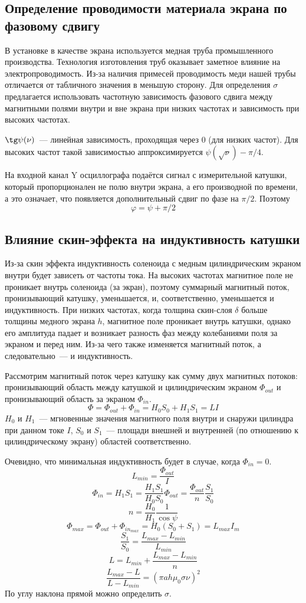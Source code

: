 \subsection{Определение проводимости материала экрана по фазовому сдвигу}
В установке в качестве экрана используется медная труба промышленного производства.
Технология изготовления труб оказывает заметное влияние на электропроводимость.
Из-за наличия примесей проводимость меди нашей трубы отличается от табличного значения
в меньшую сторону. Для определения $\sigma$ предлагается использовать частотную зависимость
 фазового сдвига между магнитными полями внутри и вне
 экрана при низких частотах и зависимость при высоких частотах.

 $\tg\psi(\nu)$~--- линейная зависимость, проходящая через 0 (для низких частот).
 Для высоких частот такой зависимостью аппроксимируется $\psi(\sqrt{\nu})-\pi/4$.

 На входной канал Y осциллографа подаётся сигнал с измерительной катушки, который пропорционален не полю внутри экрана,
 а его производной по времени, а это означает, что появляется дополнительный сдвиг по фазе на
 $\pi/2$. Поэтому
 \[
     \varphi = \psi + \pi/2
 \]
 
 \subsection{Влияние скин-эффекта на индуктивность катушки}
 Из-за скин эффекта индуктивность соленоида с медным цилиндрическим экраном
 внутри будет зависеть от частоты тока. На высоких частотах магнитное поле не проникает внутрь соленоида (за экран), поэтому суммарный магнитный поток, пронизывающий
 катушку, уменьшается, и, соответственно, уменьшается и индуктивность. При низких частотах, когда толщина скин-слоя
 $\delta$ больше толщины медного экрана $h$,  магнитное поле
 проникает внутрь катушки, однако его амплитуда падает  и возникает
 разность фаз между колебаниями поля за экраном и перед ним.  Из-за
 чего также изменяется магнитный поток, а следовательно~--- и индуктивность.

 Рассмотрим магнитный поток через катушку как сумму двух магнитных потоков:
 пронизывающий область между катушкой и цилиндрическим экраном $\Phi_{out}$ и пронизывающий область за экраном $\Phi_{in}$.
 \[
     \Phi = \Phi_{out} + \Phi_{in} = H_{0}S_{0} + H_{1}S_{1} = LI
 \]
 $H_{0}$ и $H_{1}$~---  мгновенные значения магнитного поля внутри и снаружи цилиндра при
 данном токе $I$, $S_{0}$ и $S_{1}$~--- площади внешней и внутренней (по отношению к цилиндрическому
 экрану) областей соответственно.

 Очевидно, что минимальная индуктивность будет в случае, когда $\Phi_{in} = 0$.
 \[
     L_{min} = \frac{\Phi_{out}}{I}
 \]
 \[
     \Phi_{in} = H_{1}S_{1} = \frac{H_{1}S_{1}}{H_{0}S_{0}} \Phi_{out} = \frac{\Phi_{out}}{n}\frac{S_{1}}{S_{0}}
 \]
 \[
     n = \frac{H_{0}}{H_{1}}\frac{1}{\cos\psi}
 \]
 \[
     \Phi_{max} = \Phi_{out} + \Phi_{in_{max}} = H_{0}\left(S_{0}+S_{1}\right)=L_{max}I_{m}
 \]
 \[
     \frac{S_{1}}{S_{0}} = \frac{L_{max} - L_{min}}{L_{min}}
 \]
\[
    L = L_{min} + \frac{L_{max} - L_{min}}{n}
\]
\[
    \frac{L_{max} - L}{L - L_{min}} = \left(\pi a h \mu_{0} \sigma \nu\right)^{2}
\]
По углу наклона прямой можно определить $\sigma$. 

